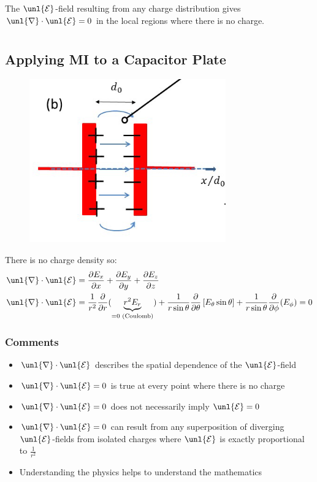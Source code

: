 \documentclass[a4paper, 11pt, normalem]{report}
\newcommand\p{\partial}
\newcommand\E{\mathcal{E}}
\newcommand\uE{\unl{\E}}
\newcommand\del{\unl{\nabla}}
\begin{document}
The $\uE$-field resulting from any charge distribution gives $\del \cdot \uE = 0$ in the local regions where there is no charge.

\chapter{}
\section{Applying M\RN{1} to a Capacitor Plate}
\begin{figure}
    \begin{center}
        \vspace{-20pt}
        \includegraphics[scale=0.4]{cap.png}
        \vspace{-90pt}
    \end{center}
\end{figure}
There is no charge density so:
\begin{align*}
    \del\cdot\uE &= \frac{\p E_x}{\p x} + \frac{\p E_y}{\p y} + \frac{\p E_z}{\p z} \\
    \del\cdot\uE &= \frac{1}{r^2}\frac{\p}{\p r}(\underbrace{r^2 E_r}_{= 0\text{ (Coulomb)}}) + \frac{1}{r\sin\theta}\frac{\p}{\p \theta}\left[E_\theta\sin\theta\right] + \frac{1}{r\sin\theta}\frac{\p}{\p \phi}(E_\phi) = 0
\end{align*}

\subsection{Comments}
\begin{itemize}
    \item $\del\cdot\uE$ describes the spatial dependence of the $\uE$-field
    \item $\del\cdot\uE = 0$ is true at every point where there is no charge
    \item $\del\cdot\uE = 0$ does not necessarily imply $\uE = 0$
    \item $\del\cdot\uE = 0$ can result from any superposition of diverging $\uE$-fields from isolated charges where $\uE$ is exactly proportional to $\frac{1}{r^2}$
    \item Understanding the physics helps to understand the mathematics
\end{itemize}
\end{document}
